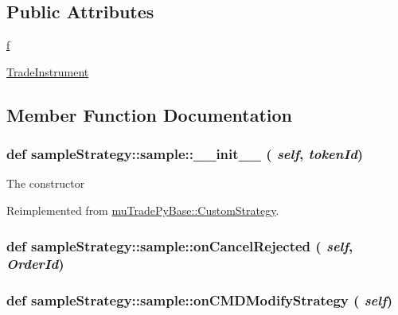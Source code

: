 \subsection*{Public Attributes}
\begin{DoxyCompactItemize}
\item 
\hyperlink{classsampleStrategy_1_1sample_af77b1aa404dd23099c1304660aba21c7}{f}
\item 
\hyperlink{classsampleStrategy_1_1sample_a16b54cb178bab35f6749e1264512c246}{TradeInstrument}
\end{DoxyCompactItemize}


\subsection{Member Function Documentation}
\hypertarget{classsampleStrategy_1_1sample_a9181fa2dc3d56ebe267718817dbc6941}{
\subsubsection[{\_\-\_\-init\_\-\_\-}]{\setlength{\rightskip}{0pt plus 5cm}def sampleStrategy::sample::\_\-\_\-init\_\-\_\- ( {\em self}, \/   {\em tokenId})}}
\label{classsampleStrategy_1_1sample_a9181fa2dc3d56ebe267718817dbc6941}
\begin{DoxyVerb}The constructor\end{DoxyVerb}
 

Reimplemented from \hyperlink{classmuTradePyBase_1_1CustomStrategy_ac6fcdf08165af5413c9883bf68dcd23b}{muTradePyBase::CustomStrategy}.\hypertarget{classsampleStrategy_1_1sample_ac7e089095ad3d2c32e459776fc188e65}{
\subsubsection[{onCancelRejected}]{\setlength{\rightskip}{0pt plus 5cm}def sampleStrategy::sample::onCancelRejected ( {\em self}, \/   {\em OrderId})}}
\label{classsampleStrategy_1_1sample_ac7e089095ad3d2c32e459776fc188e65}
\hypertarget{classsampleStrategy_1_1sample_afba39e39a71fd78abc113b6bdcbd0c7e}{
\subsubsection[{onCMDModifyStrategy}]{\setlength{\rightskip}{0pt plus 5cm}def sampleStrategy::sample::onCMDModifyStrategy ( {\em self})}}
\label{classsampleStrategy_1_1sample_afba39e39a71fd78abc113b6bdcbd0c7e}


